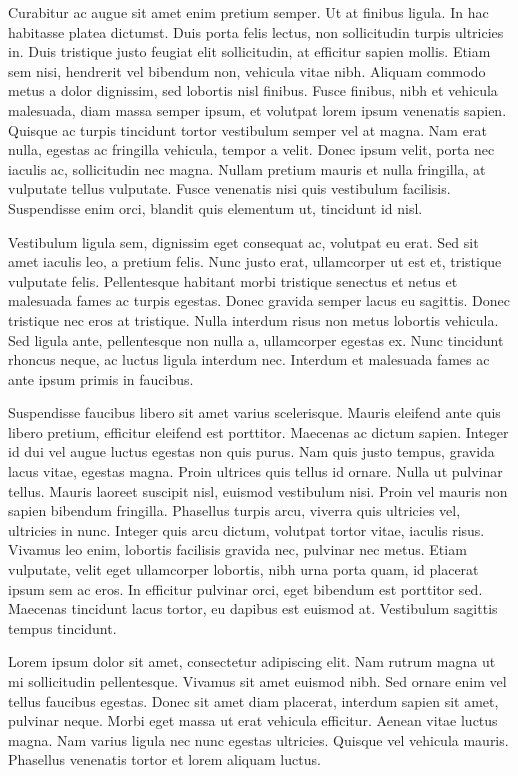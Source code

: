 Curabitur ac augue sit amet enim pretium semper. Ut at finibus ligula. In hac habitasse platea dictumst. Duis porta felis lectus, non sollicitudin turpis ultricies in. Duis tristique justo feugiat elit sollicitudin, at efficitur sapien mollis. Etiam sem nisi, hendrerit vel bibendum non, vehicula vitae nibh. Aliquam commodo metus a dolor dignissim, sed lobortis nisl finibus. Fusce finibus, nibh et vehicula malesuada, diam massa semper ipsum, et volutpat lorem ipsum venenatis sapien. Quisque ac turpis tincidunt tortor vestibulum semper vel at magna. Nam erat nulla, egestas ac fringilla vehicula, tempor a velit. Donec ipsum velit, porta nec iaculis ac, sollicitudin nec magna. Nullam pretium mauris et nulla fringilla, at vulputate tellus vulputate. Fusce venenatis nisi quis vestibulum facilisis. Suspendisse enim orci, blandit quis elementum ut, tincidunt id nisl.

Vestibulum ligula sem, dignissim eget consequat ac, volutpat eu erat. Sed sit amet iaculis leo, a pretium felis. Nunc justo erat, ullamcorper ut est et, tristique vulputate felis. Pellentesque habitant morbi tristique senectus et netus et malesuada fames ac turpis egestas. Donec gravida semper lacus eu sagittis. Donec tristique nec eros at tristique. Nulla interdum risus non metus lobortis vehicula. Sed ligula ante, pellentesque non nulla a, ullamcorper egestas ex. Nunc tincidunt rhoncus neque, ac luctus ligula interdum nec. Interdum et malesuada fames ac ante ipsum primis in faucibus.

Suspendisse faucibus libero sit amet varius scelerisque. Mauris eleifend ante quis libero pretium, efficitur eleifend est porttitor. Maecenas ac dictum sapien. Integer id dui vel augue luctus egestas non quis purus. Nam quis justo tempus, gravida lacus vitae, egestas magna. Proin ultrices quis tellus id ornare. Nulla ut pulvinar tellus. Mauris laoreet suscipit nisl, euismod vestibulum nisi. Proin vel mauris non sapien bibendum fringilla. Phasellus turpis arcu, viverra quis ultricies vel, ultricies in nunc. Integer quis arcu dictum, volutpat tortor vitae, iaculis risus. Vivamus leo enim, lobortis facilisis gravida nec, pulvinar nec metus. Etiam vulputate, velit eget ullamcorper lobortis, nibh urna porta quam, id placerat ipsum sem ac eros. In efficitur pulvinar orci, eget bibendum est porttitor sed. Maecenas tincidunt lacus tortor, eu dapibus est euismod at. Vestibulum sagittis tempus tincidunt. 

Lorem ipsum dolor sit amet, consectetur adipiscing elit. Nam rutrum magna ut mi sollicitudin pellentesque. Vivamus sit amet euismod nibh. Sed ornare enim vel tellus faucibus egestas. Donec sit amet diam placerat, interdum sapien sit amet, pulvinar neque. Morbi eget massa ut erat vehicula efficitur. Aenean vitae luctus magna. Nam varius ligula nec nunc egestas ultricies. Quisque vel vehicula mauris. Phasellus venenatis tortor et lorem aliquam luctus.

